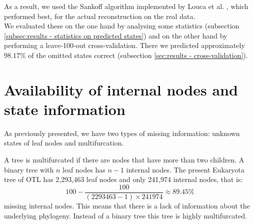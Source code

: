   As a result, we used the Sankoff algorithm \cite{Sankoff1975} implemented by Louca et al. 
    \cite{Louca2017}, which performed best, for the actual reconstruction on the real data. \\
  We evaluated these on the one hand by analysing some statistics (subsection 
    \ref{subsec:results - statistics on predicted states}) and on the other hand by performing a 
    leave-100-out cross-validation. There we predicted approximately 98.17\% of the omitted states 
    correct (subsection \ref{sec:results - cross-validation}). \\ 

  \section{Availability of internal nodes and state information} \label{sec:results - missing information}
    As previously presented, we have two types of missing information: unknown states of leaf nodes 
      and multifurcation.

    A tree is multifurcated if there are nodes that have more than two children. A binary tree with 
      $n$ leaf nodes has $n-1$ internal nodes. The present Eukaryota tree of OTL has 2,293,463 leaf 
      nodes and only 241,974 internal nodes, that is:
    $$100-\frac{100}{(2293463-1) \times 241974} \approx 89.45\%$$
      missing internal nodes. This means that there is a lack of information about the underlying 
      phylogeny. Instead of a binary tree this tree is highly multifurcated.

